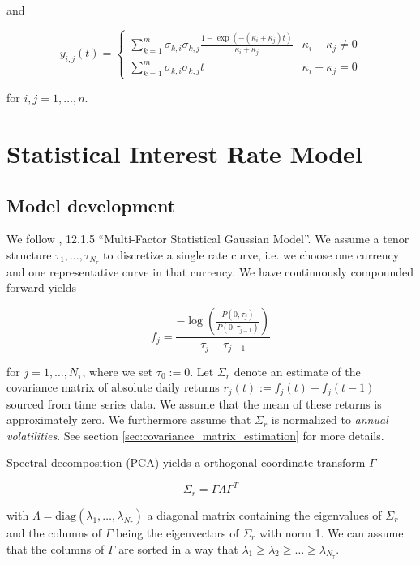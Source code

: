 \documentclass{amsart}
\theoremstyle{plain}
\numberwithin{equation}{section}
\begin{document}
and

\begin{equation}
  y_{i,j}(t) = \begin{cases}
    \sum_{k=1}^m \sigma_{k,i}\sigma_{k,j}\frac{1 - \exp ( -(\kappa_i+\kappa_j)t )}{\kappa_i+\kappa_j} & \kappa_i + \kappa_j \neq 0 \\
    \sum_{k=1}^m \sigma_{k,i}\sigma_{k,j}t & \kappa_i + \kappa_j = 0
  \end{cases}
\end{equation}

for $i,j =1,\ldots,n$.

\section{Statistical Interest Rate Model}\label{stat_ir_model}

\subsection{Model development}

We follow \cite{Andersen_Piterbarg_2010}, 12.1.5 ``Multi-Factor Statistical Gaussian Model''. We assume a tenor
structure $\tau_1, \ldots, \tau_{N_\tau}$ to discretize a single rate curve, i.e. we choose one currency and one
representative curve in that currency. We have continuously compounded forward yields

\begin{equation}\label{cont_comp_forward}
f_j = \frac{-\log \left( \frac{P(0, \tau_j)}{P(0, \tau_{j-1})} \right)}{ \tau_j - \tau_{j-1} }
\end{equation}

for $j=1,\ldots,N_\tau$, where we set $\tau_0 := 0$. Let $\Sigma_r$ denote an estimate of the covariance matrix of
absolute daily returns $r_j(t) := f_j(t) - f_j(t-1)$ sourced from time series data. We assume that the mean of these
returns is approximately zero. We furthermore assume that $\Sigma_r$ is normalized to {\em annual volatilities}. See
section \ref{sec:covariance_matrix_estimation} for more details.

Spectral decomposition (PCA) yields a orthogonal coordinate transform $\Gamma$

\begin{equation}
\Sigma_r = \Gamma \Lambda \Gamma^T
\end{equation}

with $\Lambda = \text{diag}(\lambda_1, \ldots, \lambda_{N_\tau})$ a diagonal matrix containing the eigenvalues of
$\Sigma_r$ and the columns of $\Gamma$ being the eigenvectors of $\Sigma_r$ with norm 1. We can assume that the columns
of $\Gamma$ are sorted in a way that $\lambda_1 \geq \lambda_2 \geq \ldots \geq \lambda_{N_\tau}$.
\end{document}
